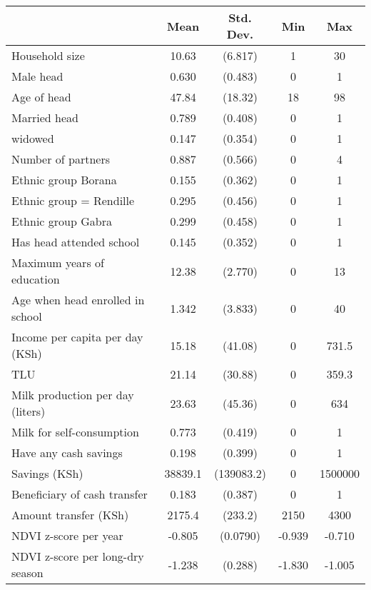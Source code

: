 \begin{tabular}{l*{1}{cccc}}
\toprule
            &        Mean&   Std. Dev.&         Min&         Max\\
\midrule
Household size&       10.63&     (6.817)&           1&          30\\
Male head   &       0.630&     (0.483)&           0&           1\\
Age of head &       47.84&     (18.32)&          18&          98\\
Married head&       0.789&     (0.408)&           0&           1\\
widowed     &       0.147&     (0.354)&           0&           1\\
Number of partners&       0.887&     (0.566)&           0&           4\\
Ethnic group Borana&       0.155&     (0.362)&           0&           1\\
Ethnic group = Rendille &       0.295&     (0.456)&           0&           1\\
Ethnic group Gabra&       0.299&     (0.458)&           0&           1\\
Has head attended school&       0.145&     (0.352)&           0&           1\\
Maximum years of education&       12.38&     (2.770)&           0&          13\\
Age when head enrolled in school&       1.342&     (3.833)&           0&          40\\
Income per capita per day (KSh)&       15.18&     (41.08)&           0&       731.5\\
TLU         &       21.14&     (30.88)&           0&       359.3\\
Milk production per day (liters)&       23.63&     (45.36)&           0&         634\\
Milk for self-consumption&       0.773&     (0.419)&           0&           1\\
Have any cash savings&       0.198&     (0.399)&           0&           1\\
Savings (KSh)&     38839.1&  (139083.2)&           0&     1500000\\
Beneficiary of cash transfer&       0.183&     (0.387)&           0&           1\\
Amount transfer (KSh)&      2175.4&     (233.2)&        2150&        4300\\
NDVI z-score per year&      -0.805&    (0.0790)&      -0.939&      -0.710\\
NDVI z-score per long-dry season&      -1.238&     (0.288)&      -1.830&      -1.005\\
\bottomrule
\end{tabular}
